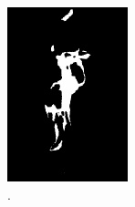 \begin{figure}[htpb!]
        \centering
        \begin{subfigure}[t]{0.2\textwidth}
                \includegraphics[width=\textwidth]{img/rushmeier_1995}
                \caption{\cite{Rushmeier:1995}.}
        \end{subfigure}%
        ~ %
        \begin{subfigure}[t]{0.162\textwidth}

\end{subfigure}
\end{figure}
